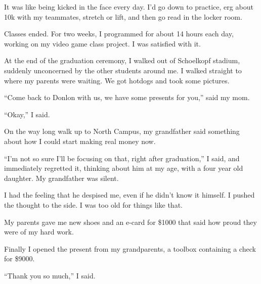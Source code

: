 It was like being kicked in the face every day.  I'd go down to practice, erg
about 10k with my teammates, stretch or lift, and then go read in the locker
room.

Classes ended.  For two weeks, I programmed for about 14 hours each day, working
on my video game class project.  I was satisfied with it.

At the end of the graduation ceremony, I walked out of Schoelkopf stadium,
suddenly unconcerned by the other students around me.  I walked straight to
where my parents were waiting.  We got hotdogs and took some pictures.  

``Come back to Donlon with us, we have some presents for you,'' said my mom. 

``Okay,'' I said.  

On the way long walk up to North Campus, my grandfather said something about how
I could start making real money now.

``I'm not so sure I'll be focusing on that, right after graduation,'' I said,
and immediately regretted it, thinking about him at my age, with a four year old
daughter.  My grandfather was silent.  

I had the feeling that he despised me, even if he didn't know it himself.  I
pushed the thought to the side.  I was too old for things like that.

My parents gave me new shoes and an e-card for \$1000 that said how proud they
were of my hard work.  

Finally I opened the present from my grandparents, a toolbox containing a check
for \$9000.  

``Thank you so much,'' I said.
